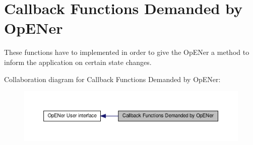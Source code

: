 \hypertarget{group__CIP__CALLBACK__API}{\section{\-Callback \-Functions \-Demanded by \-Op\-E\-Ner}
\label{d5/dc5/group__CIP__CALLBACK__API}
}


\-These functions have to implemented in order to give the \-Op\-E\-Ner a method to inform the application on certain state changes.  


\-Collaboration diagram for \-Callback \-Functions \-Demanded by \-Op\-E\-Ner\-:
\nopagebreak
\begin{figure}[H]
\begin{center}
\leavevmode
\includegraphics[width=350pt]{d5/dc5/group__CIP__CALLBACK__API}
\end{center}
\end{figure}
